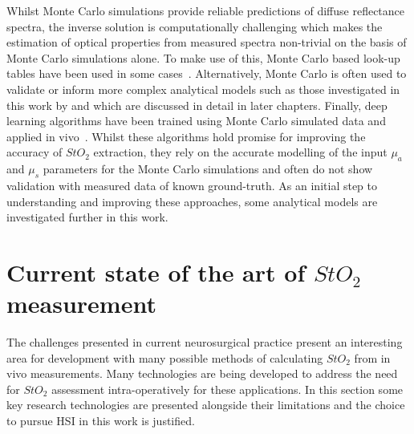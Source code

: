 Whilst Monte Carlo simulations provide reliable predictions of diffuse reflectance spectra, the inverse solution is computationally challenging which makes the estimation of optical properties from measured spectra non-trivial on the basis of Monte Carlo simulations alone. To make use of this, Monte Carlo based look-up tables have been used in some cases~\citep{Nguyen2021, Yang2022}. Alternatively, Monte Carlo is often used to validate or inform more complex analytical models such as those investigated in this work by \citet{Jacques1999} and \citet{Yudovsky2009} which are discussed in detail in later chapters. Finally, deep learning algorithms have been trained using Monte Carlo simulated data and applied in vivo~\citep{Wirkert2017, Wirkert2016}. Whilst these algorithms hold promise for improving the accuracy of $StO_2$ extraction, they rely on the accurate modelling of the input $\mu_a$ and $\mu_s$ parameters for the Monte Carlo simulations and often do not show validation with measured data of known ground-truth. As an initial step to understanding and improving these approaches, some analytical models are investigated further in this work.

\section{Current state of the art of $StO_2$ measurement}\label{sec:stateofart}
The challenges presented in current neurosurgical practice present an interesting area for development with many possible methods of calculating $StO_2$ from in vivo measurements. Many technologies are being developed to address the need for $StO_2$ assessment intra-operatively for these applications. In this section some key research technologies are presented alongside their limitations and the choice to pursue HSI in this work is justified. 

